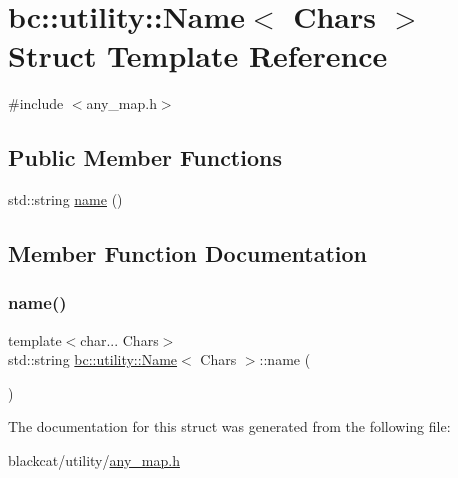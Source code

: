 \hypertarget{structbc_1_1utility_1_1Name}{}\section{bc\+:\+:utility\+:\+:Name$<$ Chars $>$ Struct Template Reference}
\label{structbc_1_1utility_1_1Name}


{\ttfamily \#include $<$any\+\_\+map.\+h$>$}

\subsection*{Public Member Functions}
\begin{DoxyCompactItemize}
\item 
std\+::string \hyperlink{structbc_1_1utility_1_1Name_a166e2ae29001520b9c414365fa3dce4a}{name} ()
\end{DoxyCompactItemize}


\subsection{Member Function Documentation}
\mbox{\label{structbc_1_1utility_1_1Name_a166e2ae29001520b9c414365fa3dce4a}} 
\subsubsection{\texorpdfstring{name()}{name()}}
{\footnotesize\ttfamily template$<$char... Chars$>$ \\
std\+::string \hyperlink{structbc_1_1utility_1_1Name}{bc\+::utility\+::\+Name}$<$ Chars $>$\+::name (\begin{DoxyParamCaption}{ }\end{DoxyParamCaption})\hspace{0.3cm}{\ttfamily [inline]}}



The documentation for this struct was generated from the following file\+:\begin{DoxyCompactItemize}
\item 
blackcat/utility/\hyperlink{any__map_8h}{any\+\_\+map.\+h}\end{DoxyCompactItemize}
